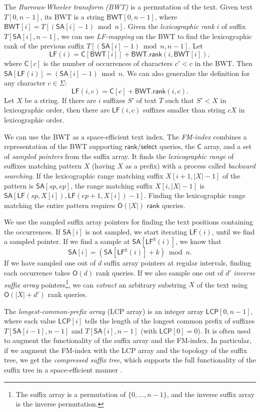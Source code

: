 \documentclass[a4paper,UKenglish]{lipics-v2016}
\newcommand{\set}[1]{\ensuremath{\{ #1 \}}}
\newcommand{\abs}[1]{\ensuremath{\lvert #1 \rvert}}
\newcommand{\Oh}[1]{\ensuremath{\mathsf{O}\!\left( #1 \right)}}
\newcommand{\rank}{\ensuremath{\mathsf{rank}}}
\newcommand{\select}{\ensuremath{\mathsf{select}}}
\newcommand{\LF}{\ensuremath{\mathsf{LF}}}
\newcommand{\LFmapping}{LF\nobreakdash-mapping}
\newcommand{\FMindex}{FM\nobreakdash-index}
\newcommand{\SA}{\ensuremath{\mathsf{SA}}}
\newcommand{\BWT}{\ensuremath{\mathsf{BWT}}}
\newcommand{\Carray}{\ensuremath{\mathsf{C}}}
\newcommand{\LCP}{\ensuremath{\mathsf{LCP}}}
\begin{document}
The \emph{Burrows-Wheeler transform (BWT)} \cite{Burrows1994} is a permutation of the text. Given text $T[0, n-1]$, its BWT is a string $\BWT[0, n-1]$, where $\BWT[i] = T[(\SA[i]-1) \bmod n]$. Given the \emph{lexicographic rank} $i$ of suffix $T[\SA[i], n-1]$, we can use \emph{\LFmapping} on the BWT to find the lexicographic rank of the previous suffix $T[(\SA[i]-1) \bmod n, n-1]$. Let
$$
\LF(i) = \Carray[\BWT[i]] + \BWT.\rank(i, \BWT[i]),
$$
where $\Carray[c]$ is the number of occurrences of characters $c' < c$ in the BWT. Then $\SA[\LF(i)] = (\SA[i]-1) \bmod n$. We can also generalize the definition for any character $c \in \Sigma$:
$$
\LF(i, c) = \Carray[c] + \BWT.\rank(i, c).
$$
Let $X$ be a string. If there are $i$ suffixes $S'$ of text $T$ such that $S' < X$ in lexicographic order, then there are $\LF(i, c)$ suffixes smaller than string $cX$ in lexicographic order.

We can use the BWT as a space-efficient text index. The \emph{\FMindex} \cite{Ferragina2005a} combines a representation of the BWT supporting $\rank$/$\select$ queries, the $\Carray$ array, and a set of \emph{sampled pointers} from the suffix array. It finds the \emph{lexicographic range} of suffixes matching pattern $X$ (having $X$ as a prefix) with a process called \emph{backward searching}. If the lexicographic range matching suffix $X[i+1, \abs{X}-1]$ of the pattern is $\SA[sp, ep]$, the range matching suffix $X[i, \abs{X}-1]$ is $\SA[\LF(sp, X[i]), \LF(ep+1, X[i]) - 1]$. Finding the lexicographic range matching the entire pattern requires $\Oh{\abs{X}}$ $\rank$ queries.

We use the sampled suffix array pointers for finding the text positions containing the occurrences. If $\SA[i]$ is not sampled, we start iterating $\LF(i)$, until we find a sampled pointer. If we find a sample at $\SA[\LF^{k}(i)]$, we know that
$$
\SA[i] = (\SA[\LF^{k}(i)] + k) \bmod n.
$$
If we have sampled one out of $d$ suffix array pointers at regular intervals, finding each occurrence takes $\Oh{d}$ rank queries. If we also sample one out of $d'$ \emph{inverse suffix array} pointers\footnote{The suffix array is a permutation of $\set{0, \dotsc, n-1}$, and the inverse suffix array is the inverse permutation.}, we can \emph{extract} an arbitrary substring $X$ of the text using $\Oh{\abs{X}+d'}$ rank queries.

The \emph{longest-common-prefix array} (LCP array) \cite{Manber1993} is an integer array $\LCP[0, n-1]$, where each value $\LCP[i]$ tells the length of the longest common prefix of suffixes $T[\SA[i-1], n-1]$ and $T[\SA[i], n-1]$ (with $\LCP[0] = 0$). It is often used to augment the functionality of the suffix array and the \FMindex. In particular, if we augment the \FMindex{} with the LCP array and the topology of the suffix tree, we get the \emph{compressed suffix tree}, which supports the full functionality of the suffix tree in a space-efficient manner \cite{Sadakane2007}.
\end{document}
